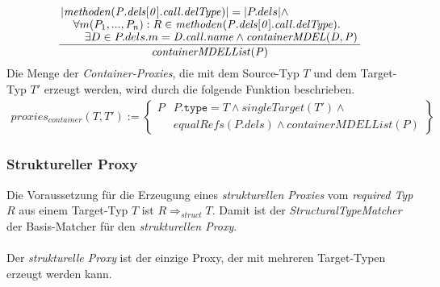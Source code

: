 \documentclass[a4paper,12pt]{article}
\begin{document}
\begin{gather*}
\frac{\splitfrac{|\mathit{methoden(P.dels[0].call.delType)}| = |P.dels| \wedge}{ \splitfrac{\forall m(P_1,...,P_n):R \in \mathit{methoden(P.dels[0].call.delType)}.}{\exists D \in P.dels.m = \mathit{D.call.name} \wedge \mathit{containerMDEL(D,P)}
 }}
}
{\mathit{containerMDELList(P)}}
\end{gather*}
Die Menge der \emph{Container-Proxies}, die mit dem Source-Typ $T$ und dem Target-Typ $T'$ erzeugt werden, wird durch die folgende Funktion beschrieben.
\begin{gather*}
\mathit{proxies_{container}(T,T')} := 
\left\{\begin{array}{l|l}
	P	& P\texttt{.type} = T \wedge  \mathit{singleTarget(T')} \wedge \mathit{ }\\
		& \mathit{equalRefs(P.dels)} \wedge \mathit{containerMDELList(P)} 
		 \end{array}
\right\}
\end{gather*}

\subsubsection{Struktureller Proxy}
Die Voraussetzung für die Erzeugung eines \emph{strukturellen Proxies} vom \emph{required Typ} $R$ aus einem Target-Typ $T$ ist $R \Rightarrow_{struct} T$. Damit ist der \emph{StructuralTypeMatcher} der Basis-Matcher für den \emph{strukturellen Proxy}.\\\\
Der \emph{strukturelle Proxy} ist der einzige Proxy, der mit mehreren Target-Typen erzeugt werden kann. 
\end{document}

